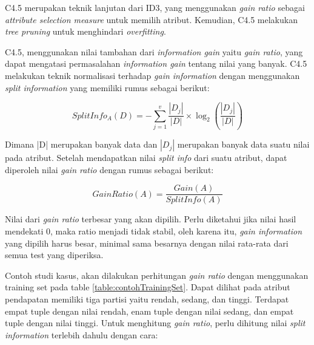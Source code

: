 C4.5 merupakan teknik lanjutan dari ID3, yang menggunakan \textsl{gain ratio} sebagai \textsl{attribute selection measure} untuk memilih atribut. Kemudian, C4.5 melakukan \textsl{tree pruning} untuk menghindari \textsl{overfitting}.


C4.5, menggunakan nilai tambahan dari \textsl{information gain} yaitu \textsl{gain ratio}, yang dapat mengatasi permasalahan \textsl{information gain} tentang nilai yang banyak. C4.5 melakukan teknik normalisasi terhadap \textsl{gain information} dengan menggunakan \textsl{split information} yang memiliki rumus sebagai berikut:

\begin{displaymath}
	SplitInfo_A(D) = - \sum_{j=1}^v \frac{|D_j|}{|D|} \times \log_2 (\frac{|D_j|}{|D|})
\end{displaymath}

Dimana |D| merupakan banyak data dan $|D_{j}|$ merupakan banyak data suatu nilai pada atribut.
Setelah mendapatkan nilai \textsl{split info} dari suatu atribut, dapat diperoleh nilai \textsl{gain ratio} dengan rumus sebagai berikut:

\begin{displaymath}
	GainRatio(A) = \frac{Gain(A)}{SplitInfo(A)}
\end{displaymath}

Nilai dari \textsl{gain ratio} terbesar yang akan dipilih. Perlu diketahui \cite{DM} jika nilai hasil mendekati 0, maka ratio menjadi tidak stabil, oleh karena itu, \textsl{gain information} yang dipilih harus besar, minimal sama besarnya dengan nilai rata-rata dari semua test yang diperiksa.

Contoh studi kasus, akan dilakukan perhitungan \textsl{gain ratio} dengan menggunakan training set pada table \ref{table:contohTrainingSet}. Dapat dilihat pada atribut pendapatan memiliki tiga partisi yaitu rendah, sedang, dan tinggi. Terdapat empat tuple dengan nilai rendah, enam tuple dengan nilai sedang, dan empat tuple dengan nilai tinggi. Untuk menghitung \textsl{gain ratio}, perlu dihitung nilai \textsl{split information} terlebih dahulu dengan cara:

